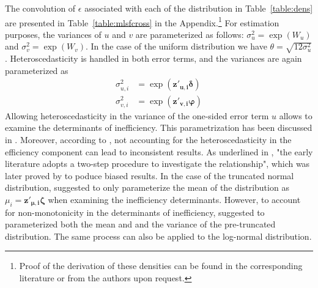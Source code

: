 \documentclass[nojss]{jss}
\begin{document}
The convolution of $\epsilon$ associated with each of the distribution in 
Table~\ref{table:dens} are presented in Table~\ref{table:mlsfcross} in the 
Appendix.\footnote{Proof of the derivation of these densities can be found in 
the corresponding literature or from the authors upon request.} For estimation 
purposes, the variances of $u$ and $v$ are parameterized as follows:
$\sigma_u^2 = \exp{\left(W_u\right)}$ and $\sigma_v^2 = \exp{\left(W_v\right)}$.
In the case of the uniform distribution we have $\theta = \sqrt{12\sigma_u^2}$.
Heteroscedasticity is handled in both error terms, and the variances are again 
parameterized as
%
\begin{align*}
\sigma_{u,i}^2 &=\exp\left(\mathbf{z'_{u,i}}\bm\delta\right) \\
\sigma_{v,i}^2 &=\exp\left( \mathbf{z'_{v, i}}\bm\varphi\right)
\end{align*}
%
Allowing heteroscedasticity in the variance of the one-sided error term $u$ 
allows to examine the determinants of inefficiency. This parametrization has 
been discussed in \citet{reif91, cau93, cau95, had99}. Moreover, according to 
\citet{wang02}, not accounting for the heteroscedasticity in the efficiency  
component can lead to inconsistent results. As underlined in 
\citet[p.~115]{kum14}, "the early literature adopts a two-step procedure to investigate 
the relationship", which was later proved by \citet{wang02} to poduce biased results.
In the case of the truncated normal distribution, \citet{kum91, hua94, batt95}
suggested to only parameterize the mean of the distribution as 
$\mu_i = \mathbf{z}'_{\bm\mu, \mathbf{i}}\bm\zeta$ when examining the 
inefficiency determinants. However, to account for non-monotonicity in the 
determinants of inefficiency, \citet{wang02b} suggested to parameterized both the 
mean and and the variance of the pre-truncated distribution. The same process
can also be applied to the log-normal distribution.
\end{document}

